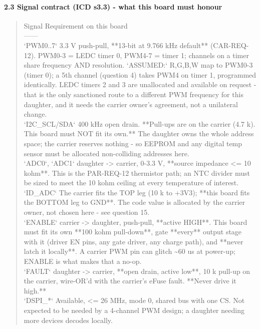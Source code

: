 \documentclass[11pt,a4paper]{article}
\begin{document}
\paragraph*{2.3 Signal contract (ICD s3.3) - what this board must honour}
\begin{quote}\small\ttfamily\raggedright
\textbar{} Signal \textbar{} Requirement on this board \textbar{}\\
\textbar{}---\textbar{}---\textbar{}\\
\textbar{} `PWM0..7` \textbar{} 3.3 V push-pull, {*}{*}13-bit at 9.766 kHz default{*}{*} (CAR-REQ-12). PWM0-3 = LEDC timer 0, PWM4-7 = timer 1; channels on a timer share frequency AND resolution. `ASSUMED:` R,G,B,W map to PWM0-3 (timer 0); a 5th channel (question 4) takes PWM4 on timer 1, programmed identically. LEDC timers 2 and 3 are unallocated and available on request - that is the only sanctioned route to a different PWM frequency for this daughter, and it needs the carrier owner's agreement, not a unilateral change. \textbar{}\\
\textbar{} `I2C\_SCL/SDA` \textbar{} 400 kHz open drain. {*}{*}Pull-ups are on the carrier (4.7 k). This board must NOT fit its own.{*}{*} The daughter owns the whole address space; the carrier reserves nothing - so EEPROM and any digital temp sensor must be allocated non-colliding addresses here. \textbar{}\\
\textbar{} `ADC0`, `ADC1` \textbar{} daughter -\textgreater{} carrier, 0-3.3 V, {*}{*}source impedance \textless{}= 10 kohm{*}{*}. This is the PAR-REQ-12 thermistor path; an NTC divider must be sized to meet the 10 kohm ceiling at every temperature of interest. \textbar{}\\
\textbar{} `ID\_ADC` \textbar{} The carrier fits the TOP leg (10 k to +3V3); {*}{*}this board fits the BOTTOM leg to GND{*}{*}. The code value is allocated by the carrier owner, not chosen here - see question 15. \textbar{}\\
\textbar{} `ENABLE` \textbar{} carrier -\textgreater{} daughter, push-pull, {*}{*}active HIGH{*}{*}. This board must fit its own {*}{*}100 kohm pull-down{*}{*}, gate {*}{*}every{*}{*} output stage with it (driver EN pins, any gate driver, any charge path), and {*}{*}never latch it locally{*}{*}. A carrier PWM pin can glitch \textasciitilde{}60 us at power-up; ENABLE is what makes that a no-op. \textbar{}\\
\textbar{} `FAULT` \textbar{} daughter -\textgreater{} carrier, {*}{*}open drain, active low{*}{*}, 10 k pull-up on the carrier, wire-OR'd with the carrier's eFuse fault. {*}{*}Never drive it high.{*}{*} \textbar{}\\
\textbar{} `DSPI\_{*}` \textbar{} Available, \textless{}= 26 MHz, mode 0, shared bus with one CS. Not expected to be needed by a 4-channel PWM design; a daughter needing more devices decodes locally. \textbar{}
\end{quote}
\end{document}
